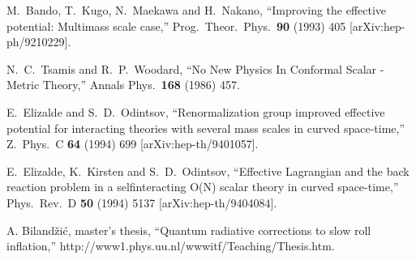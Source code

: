 \begin{thebibliography}{999}
  M.~Bando, T.~Kugo, N.~Maekawa and H.~Nakano,
  ``Improving the effective potential: Multimass scale case,''
  Prog.\ Theor.\ Phys.\  {\bf 90} (1993) 405
  [arXiv:hep-ph/9210229].

  N.~C.~Tsamis and R.~P.~Woodard,
  ``No New Physics In Conformal Scalar - Metric Theory,''
  Annals Phys.\  {\bf 168} (1986) 457.

  E.~Elizalde and S.~D.~Odintsov,
  ``Renormalization group improved effective potential for interacting theories
  with several mass scales in curved space-time,''
  Z.\ Phys.\  C {\bf 64} (1994) 699
  [arXiv:hep-th/9401057].

  E.~Elizalde, K.~Kirsten and S.~D.~Odintsov,
  ``Effective Lagrangian and the back reaction problem in a selfinteracting
  O(N) scalar theory in curved space-time,''
  Phys.\ Rev.\  D {\bf 50} (1994) 5137
  [arXiv:hep-th/9404084].

 A. Biland\v{z}i\'c, master's thesis,
``Quantum radiative corrections to slow roll inflation,''
 http://www1.phys.uu.nl/wwwitf/Teaching/Thesis.htm.

\end{thebibliography}
